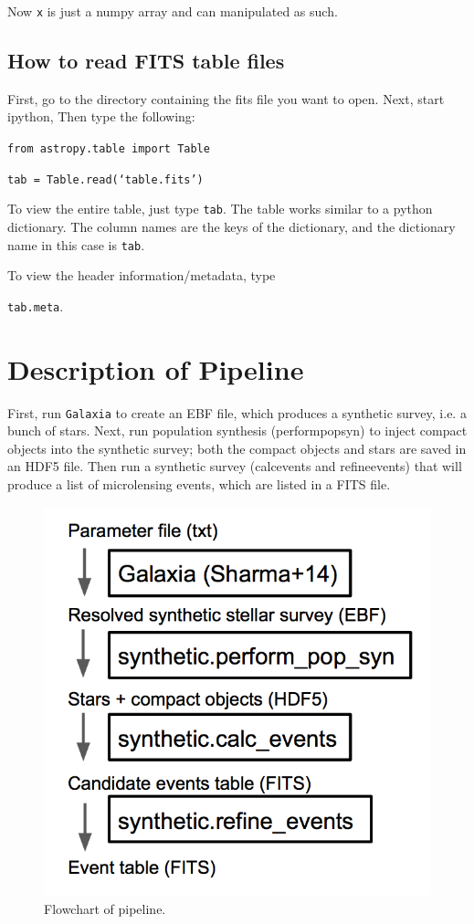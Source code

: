 \documentclass{scrartcl}
\def\tus{\textunderscore}
\begin{document}
Now \texttt{x} is just a numpy array and can manipulated as such.

\subsection{How to read FITS table files}

First, go to the directory containing the fits file you want to open. Next, start ipython, Then type the following:

\texttt{from astropy.table import Table}

\texttt{tab = Table.read(`table.fits')}

To view the entire table, just type \texttt{tab}. The table works similar to a python dictionary. 
The column names are the keys of the dictionary, and the dictionary name in this case is \texttt{tab}.

To view the header information/metadata, type

\texttt{tab.meta}.

\newpage 

\section{Description of Pipeline}

First, run \texttt{Galaxia} to create an EBF file, which produces a synthetic survey, i.e. a bunch of stars.
Next, run population synthesis (perform\tus pop\tus syn) to inject compact objects into the synthetic survey; both the compact objects and stars are saved in an HDF5 file.
Then run a synthetic survey (calc\tus events and refine\tus events) that will produce a list of microlensing events, which are listed in a FITS file.
\begin{figure}[h]
    \centering
    \includegraphics[scale=0.7]{pipeline.png}
    \caption{Flowchart of pipeline.}
\end{figure}
\end{document}
